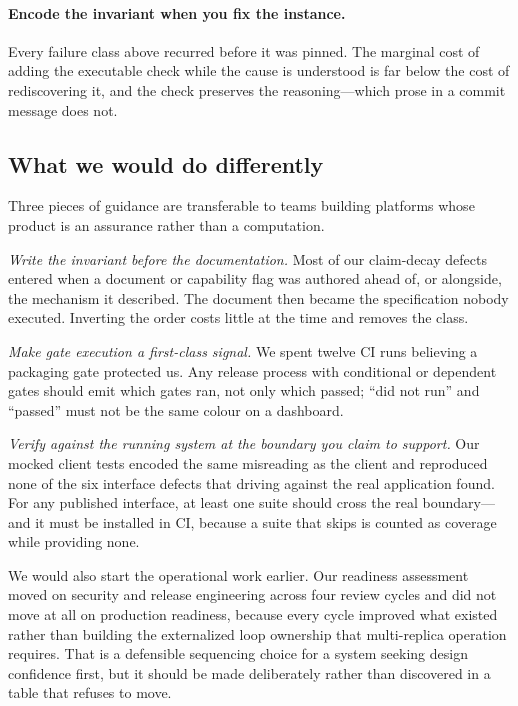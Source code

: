 \documentclass{article}
\begin{document}
\paragraph{Encode the invariant when you fix the instance.}
Every failure class above recurred before it was pinned. The marginal cost of adding
the executable check while the cause is understood is far below the cost of
rediscovering it, and the check preserves the reasoning---which prose in a commit
message does not.

\subsection{What we would do differently}

Three pieces of guidance are transferable to teams building platforms whose product
is an assurance rather than a computation.

\emph{Write the invariant before the documentation.} Most of our claim-decay
defects entered when a document or capability flag was authored ahead of, or
alongside, the mechanism it described. The document then became the specification
nobody executed. Inverting the order costs little at the time and removes the class.

\emph{Make gate execution a first-class signal.} We spent twelve CI runs believing a
packaging gate protected us. Any release process with conditional or dependent gates
should emit which gates ran, not only which passed; ``did not run'' and ``passed''
must not be the same colour on a dashboard.

\emph{Verify against the running system at the boundary you claim to support.} Our
mocked client tests encoded the same misreading as the client and reproduced none of
the six interface defects that driving against the real application found. For any
published interface, at least one suite should cross the real boundary---and it must
be installed in CI, because a suite that skips is counted as coverage while
providing none.

We would also start the operational work earlier. Our readiness assessment moved on
security and release engineering across four review cycles and did not move at all
on production readiness, because every cycle improved what existed rather than
building the externalized loop ownership that multi-replica operation requires. That
is a defensible sequencing choice for a system seeking design confidence first, but
it should be made deliberately rather than discovered in a table that refuses to
move.
\end{document}
